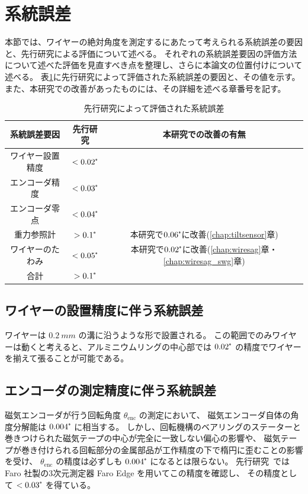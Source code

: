 \documentclass[../../main.tex]{subfiles}
\begin{document}
\section{系統誤差}
本節では、ワイヤーの絶対角度を測定するにあたって考えられる系統誤差の要因と、先行研究による評価について述べる。
それぞれの系統誤差要因の評価方法について述べた評価を見直すべき点を整理し、さらに本論文の位置付けについて述べる。
表\ref{tab:systematic_errors_old}に先行研究\cite{swg:murata}\cite{swg:iijima}によって評価された系統誤差の要因と、その値を示す。
また、本研究での改善があったものには、その詳細を述べる章番号を記す。
\begin{table}[H]
    \centering
    \caption{先行研究によって評価された系統誤差}
    \begin{tabular}{ccc}
        \hline
        \hline
        系統誤差要因 & 先行研究 & 本研究での改善の有無\\
        \hline
        ワイヤー設置精度 & $< 0.02\tcdegree$ \\
        エンコーダ精度 & $<0.03\tcdegree$ \\
        エンコーダ零点 & $<0.04\tcdegree$ \\
        重力参照計 & $>0.1\tcdegree$ & 本研究で$0.06\tcdegree$に改善(\ref{chap:tiltsensor}章) \\
        ワイヤーのたわみ & $<0.05\tcdegree$ & 本研究で$0.02\tcdegree$に改善(\ref{chap:wiresag}章・\ref{chap:wiresag_swg}章) \\
        \hline
        合計 & $>0.1\tcdegree$ \\
        \hline
        \hline
    \end{tabular}
    \label{tab:systematic_errors_old}
\end{table}
\subsection{ワイヤーの設置精度に伴う系統誤差}
ワイヤーは $\SI{0.2}{mm}$ の溝に沿うような形で設置される。
この範囲でのみワイヤーは動くと考えると、アルミニウムリングの中心部では $0.02\tcdegree$ の精度でワイヤーを揃えて張ることが可能である。
\subsection{エンコーダの測定精度に伴う系統誤差}
磁気エンコーダが行う回転角度 $\theta_{\mathrm{enc}}$ の測定において、
磁気エンコーダ自体の角度分解能は $0.004\tcdegree$ に相当する。
しかし、回転機構のベアリングのステーターと巻きつけられた磁気テープの中心が完全に一致しない偏心の影響や、
磁気テープが巻き付けられる回転部分の金属部品が工作精度の下で楕円に歪むことの影響を受け、
$\theta_{\mathrm{enc}}$ の精度は必ずしも $0.004\tcdegree$ になるとは限らない。
先行研究~\cite{swg:iijima}では Faro 社製の3次元測定器 Faro Edge を用いてこの精度を確認し、
その精度として $< 0.03\tcdegree$ を得ている。
\end{document}
